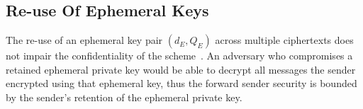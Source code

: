 \subsection{Re-use Of Ephemeral Keys}\label{subsec:veil.sres-re-using-ephemeral-keys}

The re-use of an ephemeral key pair $(d_E, Q_E)$ across multiple ciphertexts does not impair the confidentiality of the
scheme~\cite{bellare2003}.
An adversary who compromises a retained ephemeral private key would be able to decrypt all messages the sender encrypted
using that ephemeral key, thus the forward sender security is bounded by the sender's retention of the ephemeral private
key.
